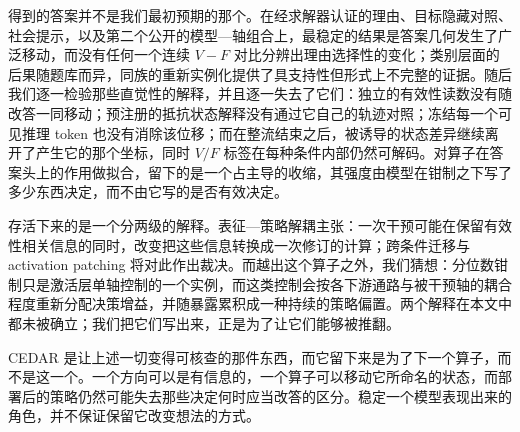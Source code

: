 \documentclass[UTF8,letterpaper,10pt,twocolumn]{ctexart}
\begin{document}
得到的答案并不是我们最初预期的那个。在经求解器认证的理由、目标隐藏对照、社会提示，以及第二个公开的模型—轴组合上，最稳定的结果是答案几何发生了广泛移动，而没有任何一个连续 $V-F$ 对比分辨出理由选择性的变化；类别层面的后果随题库而异，同族的重新实例化提供了具支持性但形式上不完整的证据。随后我们逐一检验那些直觉性的解释，并且逐一失去了它们：独立的有效性读数没有随改答一同移动；预注册的抵抗状态解释没有通过它自己的轨迹对照；冻结每一个可见推理 token 也没有消除该位移；而在整流结束之后，被诱导的状态差异继续离开了产生它的那个坐标，同时 $V/F$ 标签在每种条件内部仍然可解码。对算子在答案头上的作用做拟合，留下的是一个占主导的收缩，其强度由模型在钳制之下写了多少东西决定，而不由它写的是否有效决定。

存活下来的是一个分两级的解释。表征—策略解耦主张：一次干预可能在保留有效性相关信息的同时，改变把这些信息转换成一次修订的计算；跨条件迁移与 activation patching 将对此作出裁决。而越出这个算子之外，我们猜想：分位数钳制只是激活层单轴控制的一个实例，而这类控制会按各下游通路与被干预轴的耦合程度重新分配决策增益，并随暴露累积成一种持续的策略偏置。两个解释在本文中都未被确立；我们把它们写出来，正是为了让它们能够被推翻。

CEDAR 是让上述一切变得可核查的那件东西，而它留下来是为了下一个算子，而不是这一个。一个方向可以是有信息的，一个算子可以移动它所命名的状态，而部署后的策略仍然可能失去那些决定何时应当改答的区分。稳定一个模型表现出来的角色，并不保证保留它改变想法的方式。



\end{document}
